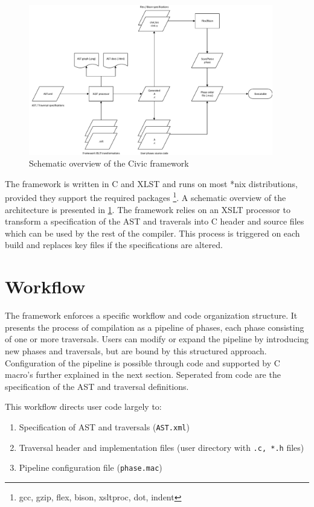 \documentclass[twoside,openright]{uva-bachelor-thesis}
\newcommand{\code}[1]{\texttt{\footnotesize#1}}
\begin{document}
		\begin{figure}[H]
			\centering
			\includegraphics[width=0.95\textwidth]{figures/architecture/overview.pdf}
			\caption{Schematic overview of the Civic framework}
			\label{build-dep}
		\end{figure}
		
		The framework is written in C and XLST and runs on most *nix distributions, provided they support the required packages \footnote{gcc, gzip, flex, bison, xsltproc, dot, indent}. A schematic overview of the architecture is presented in \cref{build-dep}. The framework relies on an XSLT processor to transform a specification of the AST and traverals into C header and source files which can be used by the rest of the compiler. This process is triggered on each build and replaces key files if the specifications are altered.
		
		
	\section{Workflow}
		The framework enforces a specific workflow and code organization structure. It presents the process of compilation as a pipeline of phases, each phase consisting of one or more traversals. Users can modify or expand the pipeline by introducing new phases and traversals, but are bound by this structured approach. Configuration of the pipeline is possible through code and supported by C macro's further explained in the next section. Seperated from code are the specification of the AST and traversal definitions. 
		
		This workflow directs user code largely to:	
		\begin{enumerate}
			\item Specification of AST and traversals (\code{AST.xml})
			\item Traversal header and implementation files (user directory with \code{*.c, *.h} files)
			\item Pipeline configuration file (\code{phase.mac})
		\end{enumerate}
		
\end{document}
